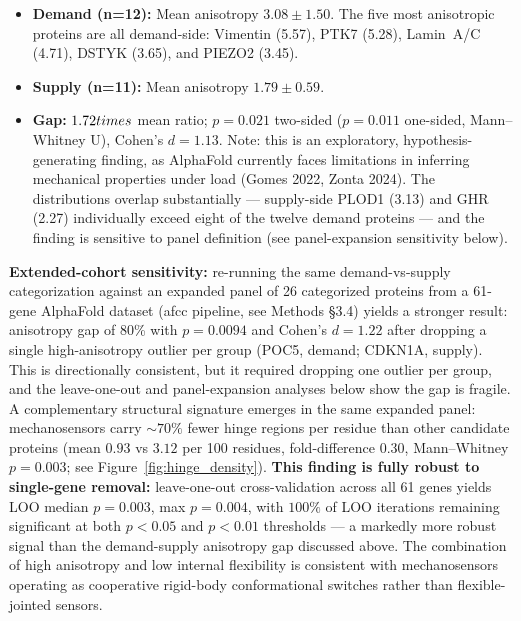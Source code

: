 \begin{itemize}
    \item \textbf{Demand (n=12):} Mean anisotropy $3.08 \pm 1.50$. The five most anisotropic proteins are all demand-side: Vimentin (5.57), PTK7 (5.28), Lamin~A/C (4.71), DSTYK (3.65), and PIEZO2 (3.45).
    \item \textbf{Supply (n=11):} Mean anisotropy $1.79 \pm 0.59$.
    \item \textbf{Gap:} $1.72\\times$ mean ratio; $p = 0.021$ two-sided ($p = 0.011$ one-sided, Mann--Whitney U), Cohen's $d = 1.13$. Note: this is an exploratory, hypothesis-generating finding, as AlphaFold currently faces limitations in inferring mechanical properties under load (Gomes 2022, Zonta 2024). The distributions overlap substantially --- supply-side PLOD1 (3.13) and GHR (2.27) individually exceed eight of the twelve demand proteins --- and the finding is sensitive to panel definition (see panel-expansion sensitivity below).
\end{itemize}

\textbf{Extended-cohort sensitivity:} re-running the same demand-vs-supply categorization against an expanded panel of 26 categorized proteins from a 61-gene AlphaFold dataset (afcc pipeline, see Methods §3.4) yields a stronger result: anisotropy gap of 80\% with $p = 0.0094$ and Cohen's $d = 1.22$ after dropping a single high-anisotropy outlier per group (POC5, demand; CDKN1A, supply). This is directionally consistent, but it required dropping one outlier per group, and the leave-one-out and panel-expansion analyses below show the gap is fragile. A complementary structural signature emerges in the same expanded panel: mechanosensors carry $\sim 70\%$ fewer hinge regions per residue than other candidate proteins (mean $0.93$ vs $3.12$ per 100 residues, fold-difference $0.30$, Mann--Whitney $p = 0.003$; see Figure~\ref{fig:hinge_density}). \textbf{This finding is fully robust to single-gene removal:} leave-one-out cross-validation across all 61 genes yields LOO median $p = 0.003$, max $p = 0.004$, with $100\%$ of LOO iterations remaining significant at both $p<0.05$ and $p<0.01$ thresholds --- a markedly more robust signal than the demand-supply anisotropy gap discussed above. The combination of high anisotropy and low internal flexibility is consistent with mechanosensors operating as cooperative rigid-body conformational switches rather than flexible-jointed sensors.

